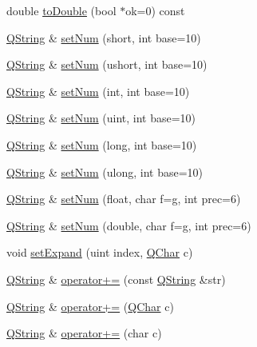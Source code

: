 \begin{DoxyCompactItemize}
double \mbox{\hyperlink{class_q_string_aab75ed74d8b5db046acbe9562e3ae1ec}{to\+Double}} (bool $\ast$ok=0) const
\item 
\mbox{\hyperlink{class_q_string}{Q\+String}} \& \mbox{\hyperlink{class_q_string_accbb06e3141abc70c20ccee59a20b1f5}{set\+Num}} (short, int base=10)
\item 
\mbox{\hyperlink{class_q_string}{Q\+String}} \& \mbox{\hyperlink{class_q_string_a74b4eb9f51f1b59e2fedcb24bb52ceae}{set\+Num}} (ushort, int base=10)
\item 
\mbox{\hyperlink{class_q_string}{Q\+String}} \& \mbox{\hyperlink{class_q_string_ad8a0d9546beed24f51af855a024af9a8}{set\+Num}} (int, int base=10)
\item 
\mbox{\hyperlink{class_q_string}{Q\+String}} \& \mbox{\hyperlink{class_q_string_adc4a9618d3977b917fb7e83135b0a4e9}{set\+Num}} (uint, int base=10)
\item 
\mbox{\hyperlink{class_q_string}{Q\+String}} \& \mbox{\hyperlink{class_q_string_a8258f5a8bf47b4690bc7ea8790dcdb73}{set\+Num}} (long, int base=10)
\item 
\mbox{\hyperlink{class_q_string}{Q\+String}} \& \mbox{\hyperlink{class_q_string_af59c75f4897bf1f709a9ca83255ab2a0}{set\+Num}} (ulong, int base=10)
\item 
\mbox{\hyperlink{class_q_string}{Q\+String}} \& \mbox{\hyperlink{class_q_string_a3cadb18e23db15cdd65c699d8b427100}{set\+Num}} (float, char f=\textquotesingle{}g\textquotesingle{}, int prec=6)
\item 
\mbox{\hyperlink{class_q_string}{Q\+String}} \& \mbox{\hyperlink{class_q_string_a5b30e9bb5310afb39f770db5fd5bf646}{set\+Num}} (double, char f=\textquotesingle{}g\textquotesingle{}, int prec=6)
\item 
void \mbox{\hyperlink{class_q_string_a8aa3d770063602b60782a1a77946af22}{set\+Expand}} (uint index, \mbox{\hyperlink{class_q_char}{Q\+Char}} c)
\item 
\mbox{\hyperlink{class_q_string}{Q\+String}} \& \mbox{\hyperlink{class_q_string_a01ef0a41636e87e459fc42f2bb2c0a70}{operator+=}} (const \mbox{\hyperlink{class_q_string}{Q\+String}} \&str)
\item 
\mbox{\hyperlink{class_q_string}{Q\+String}} \& \mbox{\hyperlink{class_q_string_a312daeba499225f6475b25cf3824d597}{operator+=}} (\mbox{\hyperlink{class_q_char}{Q\+Char}} c)
\item 
\mbox{\hyperlink{class_q_string}{Q\+String}} \& \mbox{\hyperlink{class_q_string_a44ea6d9b60995e1147f887a4e5543a1c}{operator+=}} (char c)
\item 

\end{DoxyCompactItemize}
